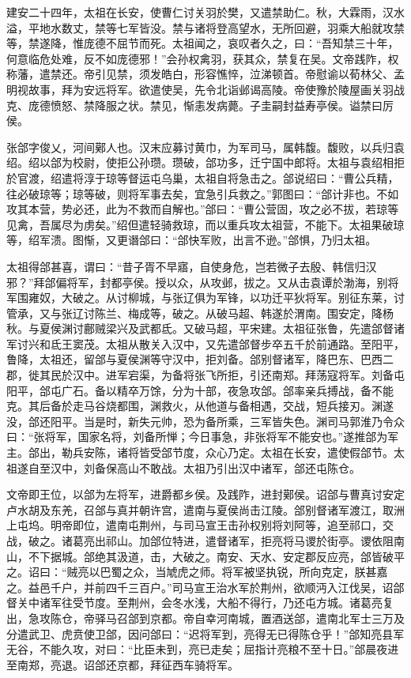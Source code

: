 \documentclass[12pt,UTF8]{ctexbook}
\begin{document}
建安二十四年，太祖在长安，使曹仁讨关羽於樊，又遣禁助仁。秋，大霖雨，汉水溢，平地水数丈，禁等七军皆没。禁与诸将登高望水，无所回避，羽乘大船就攻禁等，禁遂降，惟庞德不屈节而死。太祖闻之，哀叹者久之，曰：“吾知禁三十年，何意临危处难，反不如庞德邪！”会孙权禽羽，获其众，禁复在吴。文帝践阼，权称藩，遣禁还。帝引见禁，须发皓白，形容憔悴，泣涕顿首。帝慰谕以荀林父、孟明视故事，拜为安远将军。欲遣使吴，先令北诣邺谒高陵。帝使豫於陵屋画关羽战克、庞德愤怒、禁降服之状。禁见，惭恚发病薨。子圭嗣封益寿亭侯。谥禁曰厉侯。

张郃字俊乂，河间鄚人也。汉末应募讨黄巾，为军司马，属韩馥。馥败，以兵归袁绍。绍以郃为校尉，使拒公孙瓒。瓒破，郃功多，迁宁国中郎将。太祖与袁绍相拒於官渡，绍遣将淳于琼等督运屯乌巢，太祖自将急击之。郃说绍曰：“曹公兵精，往必破琼等；琼等破，则将军事去矣，宜急引兵救之。”郭图曰：“郃计非也。不如攻其本营，势必还，此为不救而自解也。”郃曰：“曹公营固，攻之必不拔，若琼等见禽，吾属尽为虏矣。”绍但遣轻骑救琼，而以重兵攻太祖营，不能下。太祖果破琼等，绍军溃。图惭，又更谮郃曰：“郃快军败，出言不逊。”郃惧，乃归太祖。

太祖得郃甚喜，谓曰：“昔子胥不早寤，自使身危，岂若微子去殷、韩信归汉邪？”拜郃偏将军，封都亭侯。授以众，从攻邺，拔之。又从击袁谭於渤海，别将军围雍奴，大破之。从讨柳城，与张辽俱为军锋，以功迁平狄将军。别征东莱，讨管承，又与张辽讨陈兰、梅成等，破之。从破马超、韩遂於渭南。围安定，降杨秋。与夏侯渊讨鄜贼梁兴及武都氐。又破马超，平宋建。太祖征张鲁，先遣郃督诸军讨兴和氐王窦茂。太祖从散关入汉中，又先遣郃督步卒五千於前通路。至阳平，鲁降，太祖还，留郃与夏侯渊等守汉中，拒刘备。郃别督诸军，降巴东、巴西二郡，徙其民於汉中。进军宕渠，为备将张飞所拒，引还南郑。拜荡寇将军。刘备屯阳平，郃屯广石。备以精卒万馀，分为十部，夜急攻郃。郃率亲兵搏战，备不能克。其后备於走马谷烧都围，渊救火，从他道与备相遇，交战，短兵接刃。渊遂没，郃还阳平。当是时，新失元帅，恐为备所乘，三军皆失色。渊司马郭淮乃令众曰：“张将军，国家名将，刘备所惮；今日事急，非张将军不能安也。”遂推郃为军主。郃出，勒兵安陈，诸将皆受郃节度，众心乃定。太祖在长安，遣使假郃节。太祖遂自至汉中，刘备保高山不敢战。太祖乃引出汉中诸军，郃还屯陈仓。

文帝即王位，以郃为左将军，进爵都乡侯。及践阼，进封鄚侯。诏郃与曹真讨安定卢水胡及东羌，召郃与真并朝许宫，遣南与夏侯尚击江陵。郃别督诸军渡江，取洲上屯坞。明帝即位，遣南屯荆州，与司马宣王击孙权别将刘阿等，追至祁口，交战，破之。诸葛亮出祁山。加郃位特进，遣督诸军，拒亮将马谡於街亭。谡依阻南山，不下据城。郃绝其汲道，击，大破之。南安、天水、安定郡反应亮，郃皆破平之。诏曰：“贼亮以巴蜀之众，当虓虎之师。将军被坚执锐，所向克定，朕甚嘉之。益邑千户，并前四千三百户。”司马宣王治水军於荆州，欲顺沔入江伐吴，诏郃督关中诸军往受节度。至荆州，会冬水浅，大船不得行，乃还屯方城。诸葛亮复出，急攻陈仓，帝驿马召郃到京都。帝自幸河南城，置酒送郃，遣南北军士三万及分遣武卫、虎贲使卫郃，因问郃曰：“迟将军到，亮得无已得陈仓乎！”郃知亮县军无谷，不能久攻，对曰：“比臣未到，亮已走矣；屈指计亮粮不至十日。”郃晨夜进至南郑，亮退。诏郃还京都，拜征西车骑将军。
\end{document}
